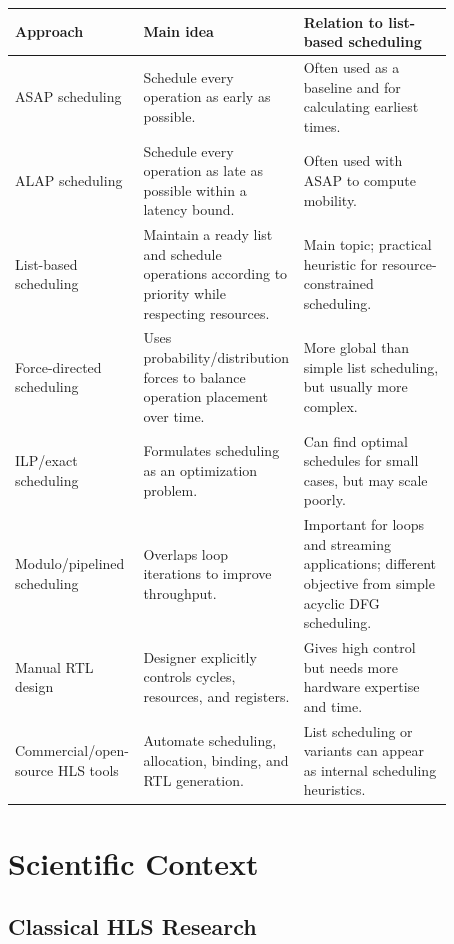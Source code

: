 \documentclass[11pt,a4paper]{article}
\begin{document}
\begin{table}[h]
\centering
\small
\begin{tabular}{p{0.22\linewidth}p{0.31\linewidth}p{0.34\linewidth}}
\toprule
Approach & Main idea & Relation to list-based scheduling \\
\midrule
ASAP scheduling & Schedule every operation as early as possible. & Often used as a baseline and for calculating earliest times. \\
ALAP scheduling & Schedule every operation as late as possible within a latency bound. & Often used with ASAP to compute mobility. \\
List-based scheduling & Maintain a ready list and schedule operations according to priority while respecting resources. & Main topic; practical heuristic for resource-constrained scheduling. \\
Force-directed scheduling & Uses probability/distribution forces to balance operation placement over time. & More global than simple list scheduling, but usually more complex. \\
ILP/exact scheduling & Formulates scheduling as an optimization problem. & Can find optimal schedules for small cases, but may scale poorly. \\
Modulo/pipelined scheduling & Overlaps loop iterations to improve throughput. & Important for loops and streaming applications; different objective from simple acyclic DFG scheduling. \\
Manual RTL design & Designer explicitly controls cycles, resources, and registers. & Gives high control but needs more hardware expertise and time. \\
Commercial/open-source HLS tools & Automate scheduling, allocation, binding, and RTL generation. & List scheduling or variants can appear as internal scheduling heuristics. \\
\bottomrule
\end{tabular}
\end{table}

\section{Scientific Context}

\subsection*{Classical HLS Research}
\end{document}
